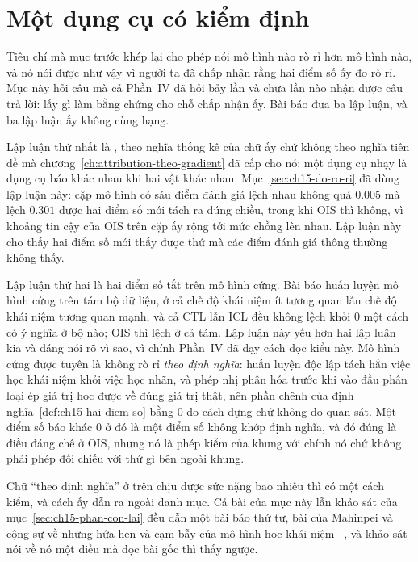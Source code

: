 \section{Một dụng cụ có kiểm định}
\label{sec:ch15-dung-cu-duoc-kiem}

%
Tiêu chí mà mục trước khép lại cho phép nói mô hình nào rò rỉ hơn mô hình nào,
và nó nói được như vậy vì người ta đã chấp nhận rằng hai điểm số ấy đo rò rỉ.
Mục này hỏi câu mà cả Phần~IV đã hỏi bảy lần và chưa lần nào nhận được câu trả
lời: lấy gì làm bằng chứng cho chỗ chấp nhận ấy. Bài báo đưa ba lập luận, và ba
lập luận ấy không cùng hạng.

%
Lập luận thứ nhất là , theo nghĩa thống kê của chữ ấy chứ không theo
nghĩa tiên đề mà chương~\ref{ch:attribution-theo-gradient} đã cấp cho nó: một
dụng cụ nhạy là dụng cụ báo khác nhau khi hai vật khác nhau.
Mục~\ref{sec:ch15-do-ro-ri} đã dùng lập luận này: cặp mô hình có sáu điểm đánh
giá lệch nhau không quá $0.005$ mà
 lệch
$0.301$ được hai điểm số mới tách ra đúng chiều, trong khi OIS thì không, vì
khoảng tin cậy của OIS trên cặp ấy rộng tới mức chồng lên nhau. Lập luận này cho
thấy hai điểm số mới thấy được thứ mà các điểm đánh giá thông thường không thấy.

%
Lập luận thứ hai là hai điểm số  tắt trên mô hình cứng. Bài báo huấn luyện mô
hình cứng trên tám bộ dữ liệu, ở cả chế độ khái niệm ít tương quan lẫn chế độ
khái niệm tương quan mạnh, và cả CTL lẫn ICL đều không lệch khỏi 0 một cách có ý
nghĩa ở bộ nào; OIS thì lệch ở cả tám. Lập luận này yếu hơn hai lập luận kia và
đáng nói rõ vì sao, vì chính Phần~IV đã dạy cách đọc kiểu này. Mô hình cứng được
tuyên là không rò rỉ \emph{theo định nghĩa}: huấn luyện độc lập tách hẳn việc học
khái niệm khỏi việc học nhãn, và phép nhị phân hóa trước khi vào đầu phân loại
ép giá trị học được về đúng giá trị thật, nên phần chênh của
định nghĩa~\ref{def:ch15-hai-diem-so} bằng 0 do cách dựng chứ không do quan sát.
Một điểm số báo khác 0 ở đó là một điểm số không khớp định nghĩa, và đó đúng là
điều đáng chê ở OIS, nhưng nó là phép kiểm  của
khung với chính nó
chứ không phải phép đối chiếu với thứ gì bên ngoài khung.

%
Chữ \enquote{theo định nghĩa} ở trên chịu được sức nặng bao nhiêu thì có một
cách kiểm, và cách ấy dẫn ra ngoài danh mục. Cả bài của mục này lẫn khảo sát của
mục~\ref{sec:ch15-phan-con-lai} đều dẫn một bài báo thứ tư, bài của Mahinpei và
cộng sự về những hứa hẹn và cạm bẫy của mô hình học khái niệm
~\autocite{mclm}, và khảo sát nói về nó một điều mà đọc
bài gốc thì thấy ngược.

